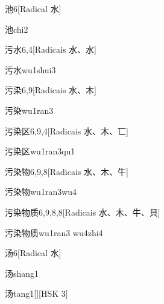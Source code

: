 \begin{entry}{池}{6}[Radical ⽔]
  \begin{phonetics}{池}{chi2}
  \end{phonetics}
\end{entry}

\begin{entry}{污水}{6,4}[Radicais ⽔、⽔]
  \begin{phonetics}{污水}{wu1shui3}
  \end{phonetics}
\end{entry}

\begin{entry}{污染}{6,9}[Radicais ⽔、⽊]
  \begin{phonetics}{污染}{wu1ran3}
  \end{phonetics}
\end{entry}

\begin{entry}{污染区}{6,9,4}[Radicais ⽔、⽊、⼖]
  \begin{phonetics}{污染区}{wu1ran3qu1}
  \end{phonetics}
\end{entry}

\begin{entry}{污染物}{6,9,8}[Radicais ⽔、⽊、⽜]
  \begin{phonetics}{污染物}{wu1ran3wu4}
  \end{phonetics}
\end{entry}

\begin{entry}{污染物质}{6,9,8,8}[Radicais ⽔、⽊、⽜、⾙]
  \begin{phonetics}{污染物质}{wu1ran3 wu4zhi4}
  \end{phonetics}
\end{entry}

\begin{entry}{汤}{6}[Radical ⽔]
  \begin{phonetics}{汤}{shang1}
  \end{phonetics}
  \begin{phonetics}{汤}{tang1}[][HSK 3]
  \end{phonetics}
\end{entry}

